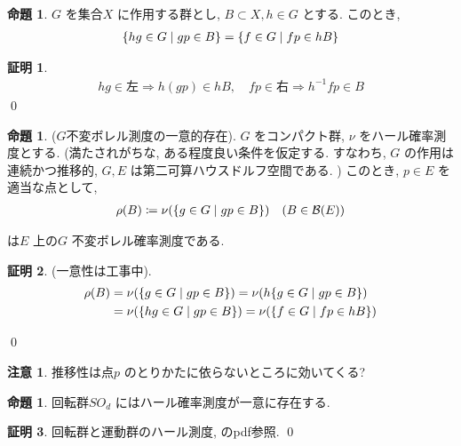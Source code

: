 \documentclass[10pt, fleqn, label-section=none]{bxjsarticle}
\theoremstyle{definition}
\newtheorem{prop}[dfn]{命題}
\newtheorem*{pf*}{証明}
\newtheorem{remark}[dfn]{注意}
\newcommand{\cbra}[1]{\mleft\{#1\mright\}}
\newcommand{\naraba}{\Rightarrow}
\renewcommand{\;}{\, ; \,}
\begin{document}
\begin{prop}$G$ を集合$X$ に作用する群とし, $B \subset X, h \in G$ とする. このとき, 
\begin{align*} \cbra{hg \in G \mid gp \in B } = \cbra{f \in G \mid fp \in hB }\end{align*}
\end{prop}
\begin{pf*}
\begin{align*} hg \in \textrm{左} \naraba h(gp) \in hB , \quad
fp \in \textrm{右} \naraba h^{-1} fp \in B
\end{align*}
\qed
\end{pf*}



\begin{prop}($G$不変ボレル測度の一意的存在). $G$ をコンパクト群, $\nu$ をハール確率測度とする. (満たされがちな, ある程度良い条件を仮定する. すなわち, $G$ の作用は連続かつ推移的, $G, E$ は第二可算ハウスドルフ空間である. ) このとき, $p \in E$ を適当な点として, 
\begin{align*} \rho(B) \coloneqq \nu (\cbra{g \in G \mid gp \in B})      \quad (B \in \mathcal B (E) ) \end{align*}

は$E$ 上の$G$ 不変ボレル確率測度である. 
\end{prop}
\begin{pf*}(一意性は工事中). 
\begin{align*} \rho(B) &= \nu (  \cbra{g \in G \mid gp \in B}   ) = \nu(h  \cbra{g \in G \mid gp \in B} )   \\
&= \nu(  \cbra{h g \in G \mid gp \in B} ) = \nu(  \cbra{f \in G \mid fp \in hB} ) 
\end{align*}

\qed
\end{pf*}

\begin{remark}推移性は点$p$ のとりかたに依らないところに効いてくる? 

\end{remark}

\begin{prop}回転群$SO_d$ にはハール確率測度が一意に存在する.

\end{prop}
\begin{pf*}
回転群と運動群のハール測度, のpdf参照.
\qed
\end{pf*}
\end{document}
